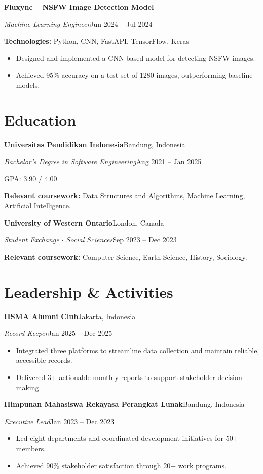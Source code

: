\documentclass[10pt,a4paper]{article}
\newcommand{\entry}[4]{%
  \textbf{#1}\hfill #2\par
  \textit{#3}\hfill #4\par
}
\newcommand{\project}[4]{%
  \textbf{#1}\par
  \textit{#2}\hfill #3\par
  \textbf{Technologies:} #4\par
}
\newcommand{\entrygap}{\vspace{4pt}}
\begin{document}
\project{Fluxync -- NSFW Image Detection Model}{Machine Learning Engineer}{Jun 2024 -- Jul 2024}
        {Python, CNN, FastAPI, TensorFlow, Keras}
\begin{itemize}
  \item Designed and implemented a CNN-based model for detecting NSFW images.
  \item Achieved 95\% accuracy on a test set of 1280 images, outperforming baseline models.
\end{itemize}

\section{Education}

\entry{Universitas Pendidikan Indonesia}{Bandung, Indonesia}
      {Bachelor's Degree in Software Engineering}{Aug 2021 -- Jan 2025}
GPA: 3.90 / 4.00\par
\textbf{Relevant coursework:} Data Structures and Algorithms, Machine Learning, Artificial Intelligence.\par
\entrygap

\entry{University of Western Ontario}{London, Canada}
      {Student Exchange $\cdot$ Social Sciences}{Sep 2023 -- Dec 2023}
\textbf{Relevant coursework:} Computer Science, Earth Science, History, Sociology.\par

\section{Leadership \& Activities}

\entry{IISMA Alumni Club}{Jakarta, Indonesia}
      {Record Keeper}{Jan 2025 -- Dec 2025}
\begin{itemize}
  \item Integrated three platforms to streamline data collection and maintain reliable, accessible records.
  \item Delivered 3+ actionable monthly reports to support stakeholder decision-making.
\end{itemize}
\entrygap

\entry{Himpunan Mahasiswa Rekayasa Perangkat Lunak}{Bandung, Indonesia}
      {Executive Lead}{Jan 2023 -- Dec 2023}
\begin{itemize}
  \item Led eight departments and coordinated development initiatives for 50+ members.
  \item Achieved 90\% stakeholder satisfaction through 20+ work programs.
\end{itemize}
\end{document}
